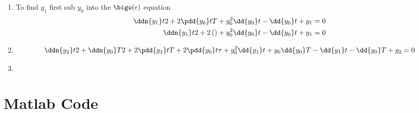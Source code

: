 \documentclass{X:/Documents/Coding/Latex/myassignment}
\begin{document}
\begin{enumerate}
\begin{enumerate}
		\item %
		To find $y_1$ first sub $y_0$ into the $\bigo(\epsilon)$ equation
		\begin{align*}
			\ddn{y_1}t2 + 2\pdd{y_0}tT + y_0^2\dd{y_0}t - \dd{y_0}t + y_1 = 0\\
			\ddn{y_1}t2 + 2\left(\right) + y_0^2\dd{y_0}t - \dd{y_0}t + y_1 = 0\\
		\end{align*}
		\item %
		\[\ddn{y_2}t2 + \ddn{y_0}T2 + 2\pdd{y_1}tT + 2\pdd{y_0}t\tau + y_0^2 \dd{y_1}t + y_0\dd{y_0}T - \dd{y_1}t - \dd{y_0}T + y_2 = 0\]
		


		\item %
	\end{enumerate}
\end{enumerate}	


\section*{Matlab Code}


\clearpage

\end{document}
